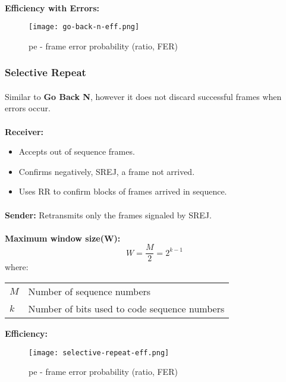 \documentclass[../resumosRCOM.tex]{subfiles}
\makeatletter
\newenvironment{conditions}
  {\par\vspace{\abovedisplayskip}\noindent\begin{tabular}{>{$}l<{$} @{${}={}$} l}}
  {\end{tabular}\par\vspace{\belowdisplayskip}}
\makeatother
\begin{document}
\paragraph{}
\textbf{Efficiency with Errors:}
\begin{figure}[H]
    \centering
    \texttt{[image: go-back-n-eff.png]}
    \caption{pe - frame error probability (ratio, FER)}
\end{figure}

\subsubsection{Selective Repeat}
\paragraph{}
Similar to \textbf{Go Back N}, however it does not discard successful frames when errors
occur.

\paragraph{}
\textbf{Receiver:}
\begin{itemize}
    \item Accepts out of sequence frames.
    \item Confirms negatively, SREJ, a frame not arrived.
    \item Uses RR to confirm blocks of frames arrived in sequence.    
\end{itemize}

\paragraph{}
\textbf{Sender:} Retransmits only the frames signaled by SREJ.

\paragraph{}
\textbf{Maximum window size(W):}
\begin{equation}
    {W}= \frac{M}{2} = 2^{k-1}
\end{equation}
where:
\begin{conditions}
    M & Number of sequence numbers\\
    k & Number of bits used to code sequence numbers \\
\end{conditions}

\textbf{Efficiency:}
\begin{figure}[H]
    \centering
    \texttt{[image: selective-repeat-eff.png]}
    \caption{pe - frame error probability (ratio, FER)}
\end{figure}
\end{document}
